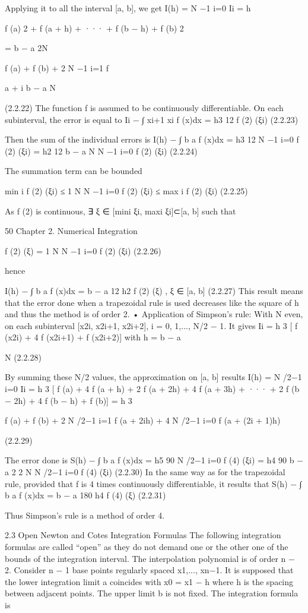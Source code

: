 \documentclass[letterpaper,12pt]{article}
\begin{document}
Applying it to all the interval [a, b], we get
I(h) =
N
−1
i=0
Ii = h

f (a)
2
+ f (a + h) + ··· + f (b − h) + f (b)
2


= b − a 2N

f (a) + f (b) + 2
N
−1
i=1
f

a + i b − a N

 (2.2.22)
The function f is assumed to be continuously differentiable. On each subinterval,
the error is equal to
Ii −
∫ xi+1
xi
f (x)dx = h3
12 f (2)
(ξi) (2.2.23)

Then the sum of the individual errors is
I(h) − ∫ b
a
f (x)dx = h3
12
N
−1
i=0
f (2)
(ξi) = h2
12
b − a
N
N
−1
i=0
f (2)
(ξi) (2.2.24)

The summation term can be bounded

min
i f (2)
(ξi) ≤ 1
N
N
−1
i=0
f (2)
(ξi) ≤ max
i f (2)
(ξi) (2.2.25)

As f (2) is continuous, ∃ ξ ∈ [mini ξi, maxi ξi]⊂[a, b] such that

50 Chapter 2. Numerical Integration

f (2)
(ξ) = 1
N
N
−1
i=0
f (2)
(ξi) (2.2.26)

hence

I(h) − ∫ b
a
f (x)dx = b − a
12
h2 f (2)
(ξ) , ξ ∈ [a, b] (2.2.27)
This result means that the error done when a trapezoidal rule is used decreases like
the square of h and thus the method is of order 2.
• Application of Simpson’s rule:
With N even, on each subinterval [x2i, x2i+1, x2i+2], i = 0, 1,..., N/2 − 1. It gives
Ii = h
3
[ f (x2i) + 4 f (x2i+1) + f (x2i+2)] with h = b − a

N (2.2.28)

By summing these N/2 values, the approximation on [a, b] results
I(h) =
N
/2−1
i=0
Ii
= h
3 [ f (a) + 4 f (a + h) + 2 f (a + 2h) + 4 f (a + 3h) + ··· +
2 f (b − 2h) + 4 f (b − h) + f (b)]
= h
3

f (a) + f (b) + 2
N
/2−1
i=1
f (a + 2ih) + 4
N
/2−1
i=0
f (a + (2i + 1)h)

(2.2.29)

The error done is
S(h) − ∫ b
a
f (x)dx = h5
90
N
/2−1
i=0
f (4)
(ξi) = h4
90
b − a
2
2
N
N
/2−1
i=0
f (4)
(ξi) (2.2.30)
In the same way as for the trapezoidal rule, provided that f is 4 times continuously
differentiable, it results that
S(h) − ∫ b
a
f (x)dx = b − a
180
h4 f (4)
(ξ) (2.2.31)

Thus Simpson’s rule is a method of order 4.

2.3 Open Newton and Cotes Integration Formulas
The following integration formulas are called “open” as they do not demand one or the
other one of the bounds of the integration interval. The interpolation polynomial is of
order n − 2. Consider n − 1 base points regularly spaced x1,..., xn−1. It is supposed
that the lower integration limit a coincides with x0 = x1 − h where h is the spacing
between adjacent points. The upper limit b is not fixed. The integration formula is
\end{document}
